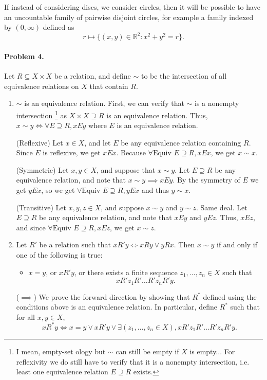 \documentclass[12pt]{article}
\begin{document}
If instead of considering discs, we consider circles, then it will be possible to have an uncountable family of pairwise disjoint circles, for example a family indexed by $(0, \infty)$ defined as
\[r \mapsto \{(x,y) \in \mathbb{R}^2 : x^2 + y^2 = r\}. \]

\paragraph{Problem 4.} Let $R \subseteq X \times X$ be a relation, and define $\sim$ to be the intersection of all equivalence relations on $X$ that contain $R$.
\begin{enumerate}
    \item[(1)] $\sim$ is an equivalence relation. First, we can verify that $\sim$ is a nonempty intersection \footnote{I mean, empty-set ology but $\sim$ can still be empty if $X$ is empty... For reflexivity we do still have to verify that it is a nonempty intersection, i.e. least one equivalence relation $E \supseteq R$ exists.} 
    as $X \times X \supseteq R$ is an equivalence relation. Thus, $x \sim y \iff \forall E \supseteq R, xEy$ where $E$ is an equivalence relation.
    
    (Reflexive) Let $x \in X$, and let $E$ be any equivalence relation containing $R$. Since $E$ is reflexive, we get $xEx$. Because $\forall \text{Equiv }E \supseteq R, xEx$, we get $x \sim x$.

    (Symmetric) Let $x,y \in X$, and suppose that $x \sim y$. Let $E \supseteq R$ be any equivalence relation, and note that $x \sim y \implies xEy$. By the symmetry of $E$ we get $yEx$, so we get $\forall\text{Equiv }E \supseteq R, yEx$ and thus $y \sim x$.

    (Transitive) Let $x,y,z \in X$, and suppose $x \sim y$ and $y \sim z$. Same deal. Let $E \supseteq R$ be any equivalence relation, and note that $xEy$ and $yEz$. Thus, $xEz$, and since $\forall\text{Equiv }E\supseteq R, xEz$, we get $x \sim z$.

    \item[(2)] Let $R'$ be a relation such that $xR'y \iff xRy \lor yRx$. Then $x\sim y$ if and only if one of the following is true:
    \begin{itemize}
        \item $x = y$, or $xR'y$, or there exists a finite sequence $z_1,\dots,z_n \in X$ such that \[xR'z_1R'\dots R'z_nR'y.\]
    \end{itemize}
    
    ($\implies$) We prove the forward direction by showing that $R^\ast$ defined using the conditions above is an equivalence relation. In particular, define $R^\ast$ such that for all $x,y \in X$,
    \[xR^\ast y \iff x = y \lor x R' y \lor \exists(z_1,\dots,z_n \in X), xR'z_1R'\dots R'z_nR'y. \]


\end{enumerate}
\end{document}
